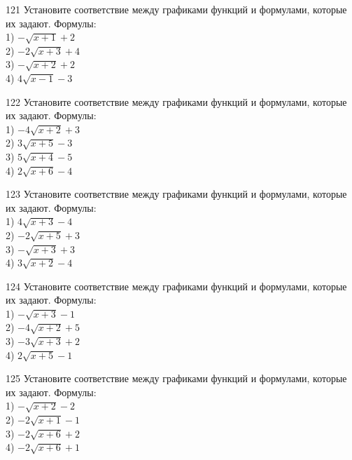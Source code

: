 \documentclass[4apaper]{article}
\begin{document}
\begin{taskBN}{121}
Установите соответствие между графиками функций и формулами, которые их задают. Формулы: \\1) $-\sqrt{x+1}+2$\\2) $-2\sqrt{x+3}+4$\\3) $-\sqrt{x+2}+2$\\4) $4\sqrt{x-1}-3$
\end{taskBN}

\begin{taskBN}{122}
Установите соответствие между графиками функций и формулами, которые их задают. Формулы: \\1) $-4\sqrt{x+2}+3$\\2) $3\sqrt{x+5}-3$\\3) $5\sqrt{x+4}-5$\\4) $2\sqrt{x+6}-4$
\end{taskBN}

\begin{taskBN}{123}
Установите соответствие между графиками функций и формулами, которые их задают. Формулы: \\1) $4\sqrt{x+3}-4$\\2) $-2\sqrt{x+5}+3$\\3) $-\sqrt{x+3}+3$\\4) $3\sqrt{x+2}-4$
\end{taskBN}

\begin{taskBN}{124}
Установите соответствие между графиками функций и формулами, которые их задают. Формулы: \\1) $-\sqrt{x+3}-1$\\2) $-4\sqrt{x+2}+5$\\3) $-3\sqrt{x+3}+2$\\4) $2\sqrt{x+5}-1$
\end{taskBN}

\begin{taskBN}{125}
Установите соответствие между графиками функций и формулами, которые их задают. Формулы: \\1) $-\sqrt{x+2}-2$\\2) $-2\sqrt{x+1}-1$\\3) $-2\sqrt{x+6}+2$\\4) $-2\sqrt{x+6}+1$
\end{taskBN}
\end{document}
